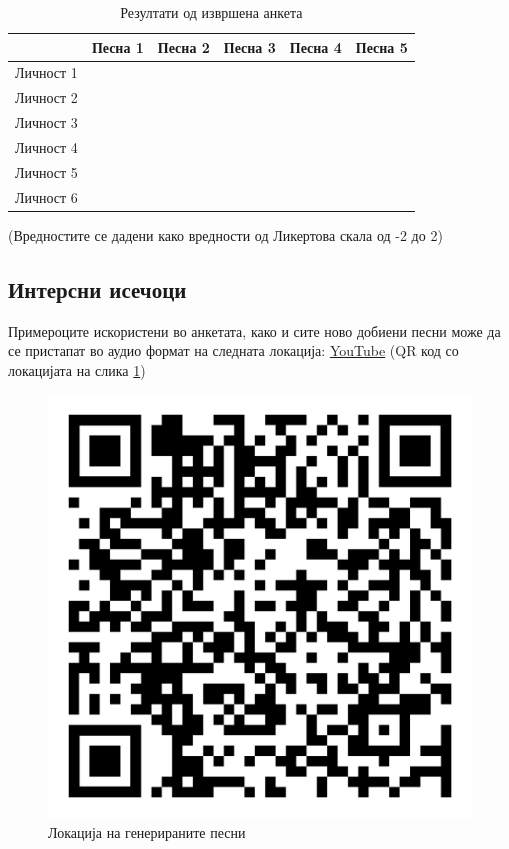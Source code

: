 \begin{table}[H]
    \centering
\begin{tabular}{@{}llllll@{}}
\toprule
   & \multicolumn{1}{c}{Песна 1} & Песна 2 & Песна 3 & Песна 4 & Песна 5 \\ \midrule
Личност 1 &                             &         &         &         &         \\
Личност 2 &                             &         &         &         &         \\
Личност 3 &                             &         &         &         &         \\
Личност 4 &                             &         &         &         &         \\
Личност 5 &                             &         &         &         &         \\
Личност 6 &                             &         &         &         &         \\ \bottomrule
\end{tabular}
    \caption{Резултати од извршена анкета}
    (Вредностите се дадени како вредности од Ликертова скала од -2 до 2)
    \label{tab:anketa}
\end{table}

\subsection{Интерсни исечоци}

Примероците искористени во анкетата, како и сите ново добиени песни може да се пристапат во аудио формат на следната локација: \href{https://www.youtube.com/playlist?list=PLxddH9FyjqCWbfwpMhn4-Ip941dfmRXfR}{YouTube} (QR код со локацијата на слика \ref{fig:qr_code})

\begin{figure}[H]
	\centering
    \includegraphics[scale=0.18]{images/playlist_qr_code.png}
	\caption{Локација на генерираните песни}
	\label{fig:qr_code}
\end{figure}

